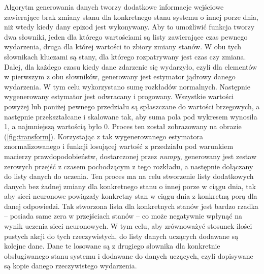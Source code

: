 Algorytm generowania danych tworzy dodatkowe informacje wejściowe zawierające brak zmiany stanu dla konkretnego stanu systemu o innej porze dnia, niż wtedy kiedy dany epizod jest wykonywany. Aby to umożliwić funkcja tworzy dwa słowniki, jeden dla którego wartościami są listy zawierające czas pewnego wydarzenia, druga dla której wartości to zbiory zmiany stanów. W obu tych słownikach kluczami są stany, dla którego rozpatrywany jest czas czy zmiana. Dalej, dla każdego czasu kiedy dane zdarzenie się wydarzyło, czyli dla elementów w pierwszym z obu słowników, generowany jest estymator jądrowy danego wydarzenia. W tym celu wykorzystano sumę rozkładów normalnych. Następnie wygenerowany estymator jest odwracany i progowany. Wszystkie wartości powyżej lub poniżej pewnego przedziału są spłaszczane do wartości brzegowych, a następnie przekształcane i skalowane tak, aby suma pola pod wykresem wynosiła 1, a najmniejszą wartością było 0. Proces ten został zobrazowany na obrazie (\ref{fig:transform}). Korzystając z tak wygenerowanego estymatora znormalizowanego i funkcji losującej wartość z przedziału pod warunkiem macierzy prawdopodobieństw, dostarczonej przez \textit{numpy}, generowany jest zestaw zerowych przejść z czasem pochodzącym z tego rozkładu, a następnie dołączany do listy danych do uczenia. Ten proces ma na celu stworzenie listy dodatkowych danych bez żadnej zmiany dla konkretnego stanu o innej porze w ciągu dnia, tak aby sieci neuronowe powiązały konkretny stan w ciągu dnia z konkretną porą dla danej odpowiedzi. Tak stworzona lista dla konkretnych stanów jest bardzo rzadka -- posiada same zera w przejściach stanów -- co może negatywnie wpłynąć na wynik uczenia sieci neuronowych. W tym celu, aby zrównoważyć stosunek ilości pustych akcji do tych rzeczywistych, do listy danych uczących dodawane są kolejne dane. Dane te losowane są z drugiego słownika dla konkretnie obsługiwanego stanu systemu i dodawane do danych uczących, czyli dopisywane są kopie danego rzeczywistego wydarzenia.

